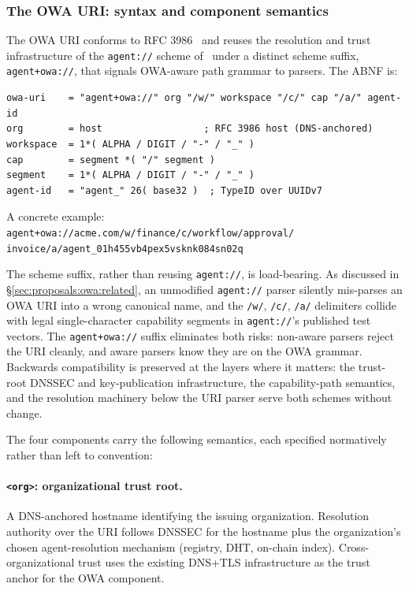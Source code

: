 \subsubsection{The OWA URI: syntax and component semantics}
\label{sec:proposals:owa:syntax}

The OWA URI conforms to RFC 3986~\cite{rfc3986} and reuses the
resolution and trust infrastructure of the
\texttt{agent://} scheme of~\cite{agent_uri_scheme} under
a distinct scheme suffix, \texttt{agent+owa://}, that
signals OWA-aware path grammar to parsers. The ABNF is:

\begin{verbatim}
owa-uri    = "agent+owa://" org "/w/" workspace "/c/" cap "/a/" agent-id
org        = host                  ; RFC 3986 host (DNS-anchored)
workspace  = 1*( ALPHA / DIGIT / "-" / "_" )
cap        = segment *( "/" segment )
segment    = 1*( ALPHA / DIGIT / "-" / "_" )
agent-id   = "agent_" 26( base32 )  ; TypeID over UUIDv7
\end{verbatim}

A concrete example: \\
\texttt{agent+owa://acme.com/w/finance/c/workflow/approval/}\\
\texttt{invoice/a/agent\_01h455vb4pex5vsknk084sn02q}

The scheme suffix, rather than reusing \texttt{agent://},
is load-bearing. As discussed in
\S\ref{sec:proposals:owa:related}, an unmodified
\texttt{agent://} parser silently mis-parses an OWA URI
into a wrong canonical name, and the \texttt{/w/},
\texttt{/c/}, \texttt{/a/} delimiters collide with legal
single-character capability segments in
\texttt{agent://}'s published test vectors. The
\texttt{agent+owa://} suffix eliminates both risks:
non-aware parsers reject the URI cleanly, and aware
parsers know they are on the OWA grammar. Backwards
compatibility is preserved at the layers where it matters:
the trust-root DNSSEC and key-publication infrastructure,
the capability-path semantics, and the resolution machinery
below the URI parser serve both schemes without change.

The four components carry the following semantics, each
specified normatively rather than left to convention:

\paragraph{\texttt{<org>}: organizational trust root.}
A DNS-anchored hostname identifying the issuing
organization. Resolution authority over the URI follows
DNSSEC for the hostname plus the organization's
chosen agent-resolution mechanism (registry, DHT,
on-chain index). Cross-organizational trust uses the
existing DNS+TLS infrastructure as the trust anchor for
the OWA component.

